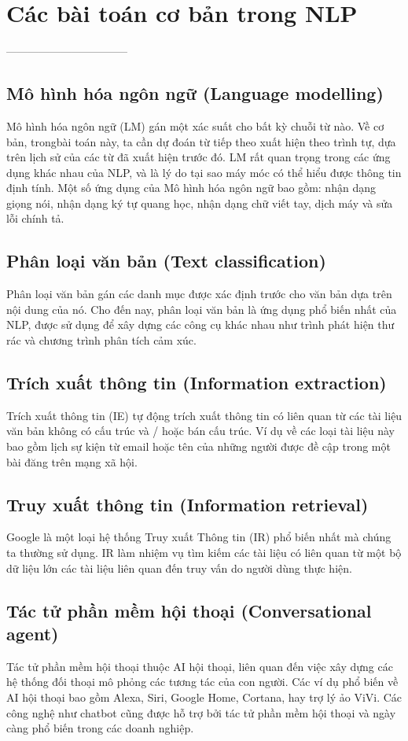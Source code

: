 \section{Các bài toán cơ bản trong NLP } 
---------------------------------
\subsection{Mô hình hóa ngôn ngữ (Language modelling)}
Mô hình hóa ngôn ngữ (LM) gán một xác suất cho bất kỳ chuỗi từ nào. Về cơ bản, trongbài toán này, ta cần dự đoán từ tiếp theo xuất hiện theo trình tự, dựa trên lịch sử của các từ đã xuất hiện trước đó. LM rất quan trọng trong các ứng dụng khác nhau của NLP, và là lý do tại sao máy móc có thể hiểu được thông tin định tính. Một số ứng dụng của Mô hình hóa ngôn ngữ bao gồm: nhận dạng giọng nói, nhận dạng ký tự quang học, nhận dạng chữ viết tay, dịch máy và sửa lỗi chính tả.\cite{WEBSITE:3}

\subsection{Phân loại văn bản (Text classification)}
Phân loại văn bản gán các danh mục được xác định trước cho văn bản dựa trên nội dung của nó. Cho đến nay, phân loại văn bản là ứng dụng phổ biến nhất của NLP, được sử dụng để xây dựng các công cụ khác nhau như trình phát hiện thư rác và chương trình phân tích cảm xúc.\cite{WEBSITE:3}

\subsection{Trích xuất thông tin (Information extraction)}
Trích xuất thông tin (IE) tự động trích xuất thông tin có liên quan từ các tài liệu văn bản không có cấu trúc và / hoặc bán cấu trúc. Ví dụ về các loại tài liệu này bao gồm lịch sự kiện từ email hoặc tên của những người được đề cập trong một bài đăng trên mạng xã hội.\cite{WEBSITE:3}

\subsection{Truy xuất thông tin (Information retrieval)}
Google là một loại hệ thống Truy xuất Thông tin (IR) phổ biến nhất mà chúng ta thường sử dụng. IR làm nhiệm vụ tìm kiếm các tài liệu có liên quan từ một bộ dữ liệu lớn các tài liệu liên quan đến truy vấn do người dùng thực hiện.\cite{WEBSITE:3}

\subsection{Tác tử phần mềm hội thoại (Conversational agent)}
Tác tử phần mềm hội thoại thuộc AI hội thoại, liên quan đến việc xây dựng các hệ thống đối thoại mô phỏng các tương tác của con người. Các ví dụ phổ biến về AI hội thoại bao gồm Alexa, Siri, Google Home, Cortana, hay trợ lý ảo ViVi. Các công nghệ như chatbot cũng được hỗ trợ bởi  tác tử phần mềm hội thoại và ngày càng phổ biến trong các doanh nghiệp.\cite{WEBSITE:3}

